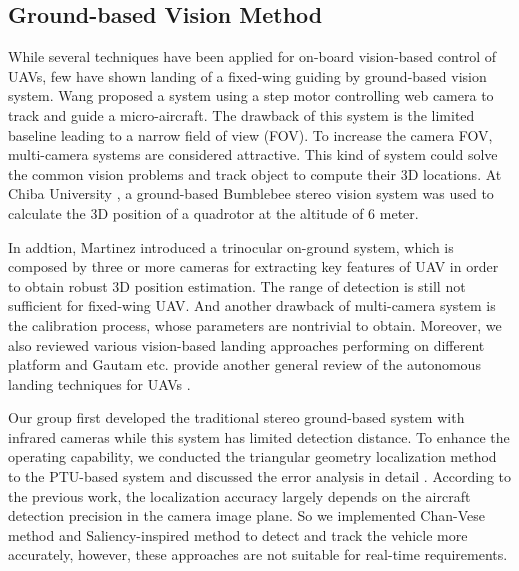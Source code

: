 \subsection{Ground-based Vision Method}
While several techniques have been applied for on-board vision-based control of UAVs, few have shown landing of a fixed-wing guiding by ground-based vision system. Wang \cite{Wang2006} proposed a system using a step motor controlling web camera to track and guide a micro-aircraft. The drawback of this system is the limited baseline leading to a narrow field of view (FOV). To increase the camera FOV, multi-camera systems are considered attractive. This kind of system could solve the common vision problems and track object to compute their 3D locations. At Chiba University \cite{pebrianti2010autonomous}, a ground-based Bumblebee stereo vision system was used to calculate the 3D position of a quadrotor at the altitude of 6 meter. 

In addtion, Martinez \cite{Martinez2009a} introduced a trinocular on-ground system, which is composed by three or more cameras for extracting key features of UAV in order to obtain robust 3D position estimation. The range of detection is still not sufficient for fixed-wing UAV. And another drawback of multi-camera system is the calibration process, whose parameters are nontrivial to obtain. Moreover, we also reviewed various vision-based landing approaches performing on different platform \cite{kong2014vision} and Gautam etc. provide another general review of the autonomous landing techniques for UAVs \cite{Gautam2014}.

Our group first developed the traditional stereo ground-based system with infrared cameras \cite{kong2013autonomous} while this system has limited detection distance. To enhance the operating capability, we conducted the triangular geometry localization method to the PTU-based system and discussed the error analysis in detail \cite{kong2014ground}. According to the previous work, the localization accuracy largely depends on the aircraft detection precision in the camera image plane. So we implemented Chan-Vese method \cite{tang2016ground} and Saliency-inspired method \cite{ma2016stereo} to detect and track the vehicle more accurately, however, these approaches are not suitable for real-time requirements.




